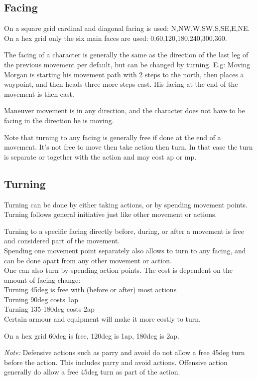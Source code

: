 \subsection*{Facing}
On a square grid cardinal and diagonal facing is used: N,NW,W,SW,S,SE,E,NE.
On a hex grid only the six main faces are used: 0,60,120,180,240,300,360.

The facing of a character is generally the same as the direction of the last leg of the previous movement per default, but can be changed by turning. E.g: Moving Morgan is starting his movement path with 2 steps to the north, then places a waypoint, and then heads three more steps east. His facing at the end of the movement is then east.

Maneuver movement is in any direction, and the character does not have to be facing in the direction he is moving.

Note that turning to any facing is generally free if done at the end of a movement. It's not free to move then take action then turn. In that case the turn is separate or together with the action and may cost ap or mp.


\subsection*{Turning}
Turning can be done by either taking actions, or by spending movement points. Turning follows general initiative just like other movement or actions.

Turning to a specific facing directly before, during, or after a movement is free and considered part of the movement. \\
Spending one movement point separately also allows to turn to any facing, and can be done apart from any other movement or action. \\
One can also turn by spending action points. The cost is dependent on the amount of facing change: \\
Turning 45deg is free with (before or after) most actions \\
Turning 90deg costs 1ap \\
Turning 135-180deg costs 2ap \\
Certain armour and equipment will make it more costly to turn.

On a hex grid 60deg is free, 120deg is 1ap, 180deg is 2ap.

\emph{Note:} Defensive actions such as parry and avoid do not allow a free 45deg turn before the action. This includes parry and avoid actions. Offensive action generally do allow a free 45deg turn as part of the action.


